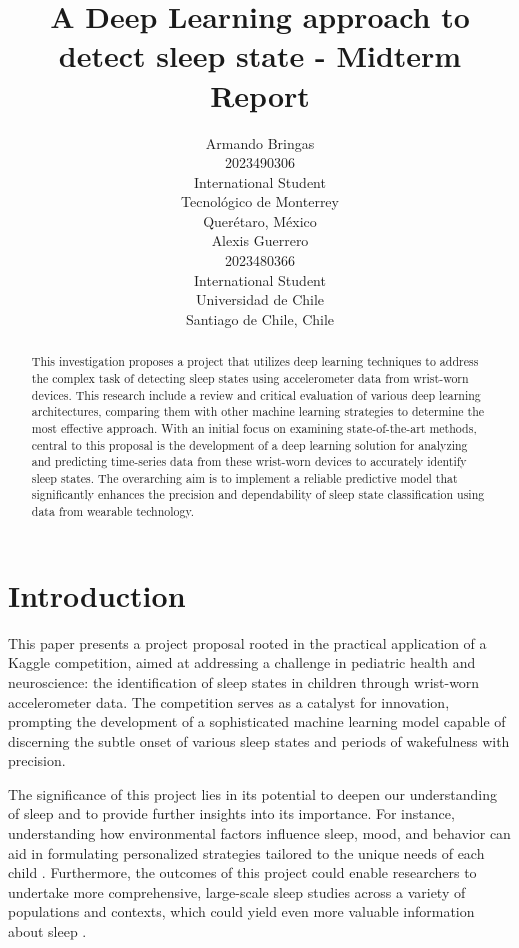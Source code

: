 \documentclass{article}
\title{A Deep Learning approach to detect sleep state - Midterm Report}
\author{%
  Armando Bringas \\
  2023490306 \\
  International Student \\
  Tecnológico de Monterrey \\
  Querétaro, México \\
  \And
  Alexis Guerrero \\
  2023480366 \\
  International Student \\
  Universidad de Chile \\
  Santiago de Chile, Chile \\
}
\begin{document}
\maketitle





\begin{abstract}
This investigation proposes a project that utilizes deep learning techniques to address the complex task of detecting sleep states using accelerometer data from wrist-worn devices. This research include a review and critical evaluation of various deep learning architectures, comparing them with other machine learning strategies to determine the most effective approach. With an initial focus on examining state-of-the-art methods, central to this proposal is the development of a deep learning solution for analyzing and predicting time-series data from these wrist-worn devices to accurately identify sleep states. The overarching aim is to implement a reliable predictive model that significantly enhances the precision and dependability of sleep state classification using data from wearable technology.
\end{abstract}


\section{Introduction}

This paper presents a project proposal rooted in the practical application of a Kaggle competition, aimed at addressing a challenge in pediatric health and neuroscience: the identification of sleep states in children through wrist-worn accelerometer data. The competition serves as a catalyst for innovation, prompting the development of a sophisticated machine learning model capable of discerning the subtle onset of various sleep states and periods of wakefulness with precision.

The significance of this project lies in its potential to deepen our understanding of sleep and to provide further insights into its importance. For instance, understanding how environmental factors influence sleep, mood, and behavior can aid in formulating personalized strategies tailored to the unique needs of each child \cite{child-mind-institute-detect-sleep-states}. Furthermore, the outcomes of this project could enable researchers to undertake more comprehensive, large-scale sleep studies across a variety of populations and contexts, which could yield even more valuable information about sleep \cite{child-mind-institute-detect-sleep-states}.
\end{document}
